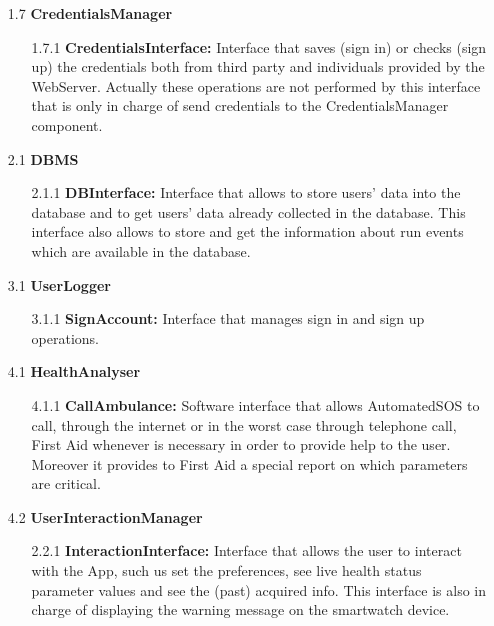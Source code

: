 \begin{enumerate}
\item[1.7] \textbf{CredentialsManager}
	\begin{enumerate}
		\item[1.7.1] \textbf{CredentialsInterface:} Interface that saves (sign in) or checks (sign up) the credentials both from third party and individuals provided by the WebServer. Actually these operations are not performed by this interface that is only in charge of send credentials to the CredentialsManager component.
	\end{enumerate}

\item[2.1] \textbf{DBMS}
	\begin{enumerate}
		\item[2.1.1] \textbf{DBInterface:} Interface that allows to store users' data into the database and to get users' data already collected in the database. This interface also allows to store and get the information about run events which are available in the database.
	\end{enumerate}
	
\item[3.1] \textbf{UserLogger}
	\begin{enumerate}
		\item[3.1.1] \textbf{SignAccount:} Interface that manages sign in and sign up operations.
	\end{enumerate}
	
\item[4.1] \textbf{HealthAnalyser}
	\begin{enumerate}
		\item[4.1.1] \textbf{CallAmbulance:} Software interface that allows AutomatedSOS to call, through the internet or in the worst case through telephone call, First Aid whenever is necessary in order to provide help to the user. Moreover it provides to First Aid a special report on which parameters are critical.	
	\end{enumerate}
\item[4.2] \textbf{UserInteractionManager}
	\begin{enumerate}
		\item[2.2.1] \textbf{InteractionInterface:} Interface that allows the user to interact with the App, such us set the preferences, see live health status parameter values and see the (past) acquired info. This interface is also in charge of displaying the warning message on the smartwatch device.
	\end{enumerate}	
	

\end{enumerate}

